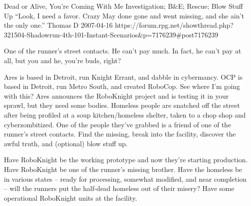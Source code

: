 \begin{scenario}{Dead or Alive, You're Coming With Me}
	{Investigation; B\&E; Rescue; Blow Stuff Up}
	{``Look, I need a favor. Crazy May done gone and went missing, and she ain't the only one.''}
	{Thomas D}
	{2007-04-16}
	{https://forum.rpg.net/showthread.php?321504-Shadowrun-4th-101-Instant-Scenarios\&p=7176239\#post7176239}

 One of the runner's street contacts. He can't pay much. In fact, he can't pay at all, but you and he, you're buds, right?

\synopsis Ares is based in Detroit, run Knight Errant, and dabble in cybermancy. OCP is based in Detroit, run Metro South, and created RoboCop. See where I'm going with this? Ares announces the RoboKnight project and is testing it in your sprawl, but they need some bodies. Homeless people are snatched off the street after being profiled at a soup kitchen/homeless shelter, taken to a chop shop and cyberzombitized. One of the people they've grabbed is a friend of one of the runner's street contacts. Find the missing, break into the facility, discover the awful truth, and (optional) blow stuff up.

\notes Have RoboKnight be the working prototype and now they're starting production. Have RoboKnight be one of the runner's missing brother. Have the homeless be in various states -- ready for processing, somewhat modified, and near completion -- will the runners put the half-dead homeless out of their misery? Have some operational RoboKnight units at the facility. 

\end{scenario}